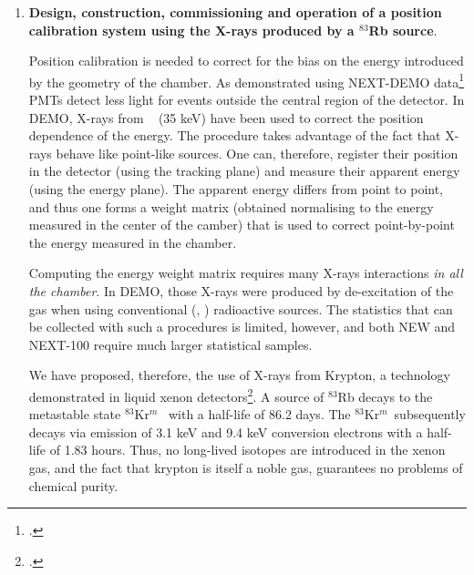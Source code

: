 \begin{enumerate}
The \TL\ source also produces double electrons (double scape peak of \TL), with an energy of 1.6 MeV, not very far from \Qbb. Such double electrons, together with single electrons at 1.3 MeV from a \NA\ source can be used to measure single and double electron selection efficiency from the data themselves (recall that the selection of \bb\ events require a positive double-electron identification).

Calibration runs will be taken periodically. Typically a long run per month should be enough, but the exact procedure will be defined as part of the commissioning process of NEW and then of NEXT-100. 

\item {\bf Design, construction, commissioning and operation of a position calibration system using the X-rays produced by a $^{83}$Rb source}. 

Position calibration is needed to correct for the bias on the energy introduced by the geometry of the chamber. As demonstrated using NEXT-DEMO data\footcite{Lorca:2014sra} PMTs detect less light for events outside the central region of the detector. In DEMO, X-rays from \Xe ~ (35 keV) have been used to correct the position dependence of the energy. The procedure takes advantage of the fact that X-rays behave like point-like sources. One can, therefore, register their position in the detector (using the tracking plane) and measure their apparent energy (using the energy plane). The apparent energy differs from point to point, and thus one forms a weight matrix  (obtained normalising to the energy measured in the center of the camber) that is used to correct point-by-point the energy measured in the chamber.

Computing the energy weight matrix requires many X-rays interactions {\em in all the chamber}. In DEMO, those X-rays were produced by de-excitation of the gas when using conventional (\NA, \CS) radioactive sources. The statistics that can be collected with such a procedures is limited, however, and both NEW and NEXT-100 require much larger statistical samples.

We have proposed, therefore, the use of X-rays from Krypton, a technology demonstrated in liquid xenon detectors\footcite{Kastens:2009rt}. A source of $^{83}$Rb
decays to the metastable state  $^{83}$Kr$^m$~ with a half-life of 86.2 days. The
$^{83}$Kr$^m$~subsequently decays via emission of 3.1 keV and 9.4 keV conversion electrons with a half-life of 1.83 hours. Thus, no long-lived isotopes are introduced in the xenon gas, and the fact that krypton is itself a noble gas, guarantees no problems of chemical purity.  


\end{enumerate}
